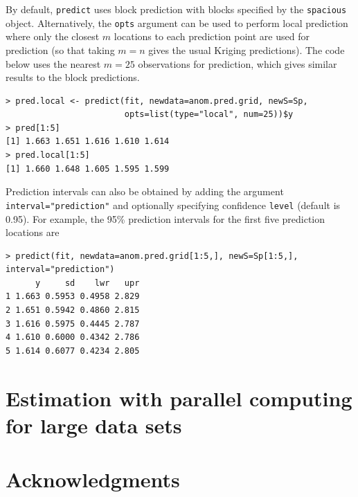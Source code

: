 \documentclass[11pt]{article}
\begin{document}
By default, {\tt predict} uses block prediction \citep{Eidsvik:2013} with blocks specified by the {\tt spacious} object.
Alternatively, the {\tt opts} argument can be used to perform local prediction where only the closest $m$ locations to each prediction point are used for prediction (so that taking $m=n$ gives the usual Kriging predictions).
The code below uses the nearest $m=25$ observations for prediction, which gives similar results to the block predictions.

\begin{verbatim}
> pred.local <- predict(fit, newdata=anom.pred.grid, newS=Sp,
                        opts=list(type="local", num=25))$y
> pred[1:5]
[1] 1.663 1.651 1.616 1.610 1.614
> pred.local[1:5]
[1] 1.660 1.648 1.605 1.595 1.599
\end{verbatim}

Prediction intervals can also be obtained by adding the argument {\tt interval="prediction"} and optionally specifying confidence {\tt level} (default is 0.95).
For example, the 95\% prediction intervals for the first five prediction locations are

\begin{verbatim}
> predict(fit, newdata=anom.pred.grid[1:5,], newS=Sp[1:5,], interval="prediction")
      y     sd    lwr   upr
1 1.663 0.5953 0.4958 2.829
2 1.651 0.5942 0.4860 2.815
3 1.616 0.5975 0.4445 2.787
4 1.610 0.6000 0.4342 2.786
5 1.614 0.6077 0.4234 2.805
\end{verbatim}

\section{Estimation with parallel computing for large data sets}\label{s:parallel}

\section*{Acknowledgments}

\begin{singlespace}
	
	
\end{singlespace}
\end{document}

